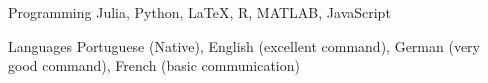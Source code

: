 

\begin{cvskills}

  \cvskill
    {Programming} %
    {Julia, Python, LaTeX, R, MATLAB, JavaScript} %

  \cvskill
    {Languages} %
    {Portuguese (Native), English (excellent command), 
    German (very good command), French (basic communication)} %

\end{cvskills}
